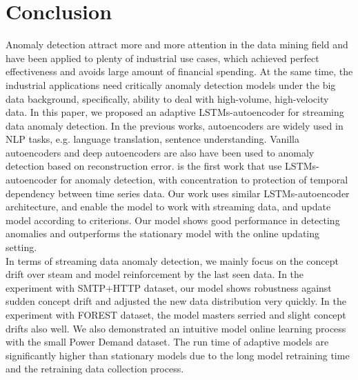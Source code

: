 \chapter{Conclusion}
\label{chap:conclusion}



Anomaly detection attract more and more attention in the data mining field and have been applied to plenty of industrial use cases, which achieved perfect effectiveness and avoids large amount of financial spending. At the same time, the industrial applications need critically anomaly detection models under the big data background, specifically, ability to deal with high-volume, high-velocity data. In this paper, we proposed an adaptive LSTMs-autoencoder for streaming data anomaly detection. In the previous works, autoencoders are widely used in NLP tasks, e.g. language translation, sentence understanding. Vanilla autoencoders and deep autoencoders are also have been used to anomaly detection based on reconstruction error. \cite{encdecad} is the first work that use LSTMs-autoencoder for anomaly detection, with concentration to protection of temporal dependency between time series data. Our work uses similar LSTMs-autoencoder architecture, and enable the model to work with streaming data, and update model according to criterions. Our model shows good performance in detecting anomalies and outperforms the stationary model with the online updating setting.\\
In terms of streaming data anomaly detection, we mainly focus on the concept drift over steam and model reinforcement by the last seen data. In the experiment with SMTP+HTTP dataset, our model shows robustness against sudden concept drift and adjusted the new data distribution very quickly. In the experiment with FOREST dataset, the model masters serried and slight concept drifts also well. We also demonstrated an intuitive model online learning process with the small Power Demand dataset. The run time of adaptive models are significantly higher than stationary models due to the long model retraining time and the retraining data collection process.
